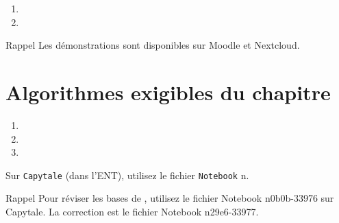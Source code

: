 \documentclass[12pt,french,oneside]{report}
\begin{document}
\begin{spacing}{1.2}
\begin{enumerate}
\item 

\item 

\end{enumerate}

\medskip

\begin{CadreModule}{Rappel}
Les démonstrations sont disponibles sur Moodle et Nextcloud.
\end{CadreModule}



\section*{Algorithmes exigibles du chapitre}

\begin{enumerate}
\item 

\item 

\item 

\end{enumerate}

Sur \verb~Capytale~ (dans l'ENT), utilisez le fichier \verb~Notebook~ n\degres .

\medskip

\begin{CadreModule}{Rappel}
Pour réviser les bases de \python, utilisez le fichier \og Notebook\fg{} n\degres 0b0b-33976 sur Capytale.
La correction est le fichier \og Notebook\fg{} n\degres 29e6-33977.
\end{CadreModule}

\section{}



\section{}




\end{spacing}
\end{document}
